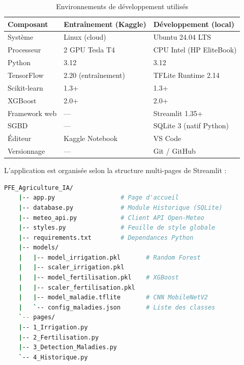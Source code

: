 \begin{table}[H]
	\centering
	\caption{Environnements de développement utilisés}
	\label{tab:environnements}
	\small
	\begin{tabularx}{\textwidth}{lXX}
		\toprule
		\textbf{Composant} & \textbf{Entraînement (Kaggle)} &
		\textbf{Développement (local)} \\
		\midrule
		Système       & Linux (cloud)         & Ubuntu 24.04 LTS \\
		Processeur    & 2 GPU Tesla T4        & CPU Intel (HP EliteBook) \\
		Python        & 3.12                  & 3.12 \\
		TensorFlow    & 2.20 (entraînement)   & TFLite Runtime 2.14 \\
		Scikit-learn  & 1.3+                  & 1.3+ \\
		XGBoost       & 2.0+                  & 2.0+ \\
		Framework web & ---                   & Streamlit 1.35+ \\
		SGBD          & ---                   & SQLite 3 (natif Python) \\
		Éditeur       & Kaggle Notebook       & VS Code \\
		Versionnage   & ---                   & Git / GitHub \\
		\bottomrule
	\end{tabularx}
\end{table}

L'application est organisée selon la structure multi-pages de
Streamlit :

\begin{lstlisting}[language=bash,
	caption={Structure des fichiers de l'application},
	label={lst:structure}]
	PFE_Agriculture_IA/
	|-- app.py                  # Page d'accueil
	|-- database.py             # Module Historique (SQLite)
	|-- meteo_api.py            # Client API Open-Meteo
	|-- styles.py               # Feuille de style globale
	|-- requirements.txt        # Dependances Python
	|-- models/
	|   |-- model_irrigation.pkl       # Random Forest
	|   |-- scaler_irrigation.pkl
	|   |-- model_fertilisation.pkl    # XGBoost
	|   |-- scaler_fertilisation.pkl
	|   |-- model_maladie.tflite       # CNN MobileNetV2
	|   `-- config_maladies.json       # Liste des classes
	`-- pages/
	|-- 1_Irrigation.py
	|-- 2_Fertilisation.py
	|-- 3_Detection_Maladies.py
	`-- 4_Historique.py
\end{lstlisting}

